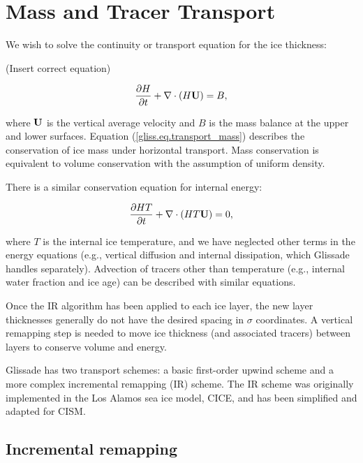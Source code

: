 
\section{Mass and Tracer Transport}
\label{sc:glissade-transport}

We wish to solve the continuity or transport equation for the ice thickness:

(Insert correct equation)

\begin{equation}
  \label{gliss.eq.transport_mass}
  \frac{\partial H}{\partial t} + \nabla \cdot (H {\bf U}) = B,
\end{equation}

\noindent
where ${\bf U}$ is the vertical average velocity and $B$ is the 
mass balance at the upper and lower surfaces.
Equation (\ref{gliss.eq.transport_mass}) describes the conservation of
ice mass under horizontal transport.  
Mass conservation is equivalent to volume conservation with the assumption
of uniform density.

There is a similar conservation equation for internal energy:

\begin{equation}
  \label{gliss.eq.transport_energy}
  \frac{\partial{H T}}{\partial t} + \nabla \cdot (H T {\bf U}) = 0,
\end{equation}

where $T$ is the internal ice temperature, and we have neglected other terms in the
energy equations (e.g., vertical diffusion and internal dissipation, which Glissade handles
separately).
Advection of tracers other than temperature (e.g., internal water fraction and ice age)
can be described with similar equations.


Once the IR algorithm has been applied to each ice layer, the new layer thicknesses
generally do not have the desired spacing in $\sigma$ coordinates.
A vertical remapping step is needed to move ice thickness (and associated
tracers) between layers to conserve volume and energy.

Glissade has two transport schemes: a basic first-order
upwind scheme and a more complex incremental remapping (IR) scheme.
The IR scheme \citep{Dukowicz2000, Lipscomb2004} 
was originally implemented in the Los Alamos sea ice model, CICE,
and has been simplified and adapted for CISM.  

\subsection{Incremental remapping}
\label{sc:incremental_remapping}

